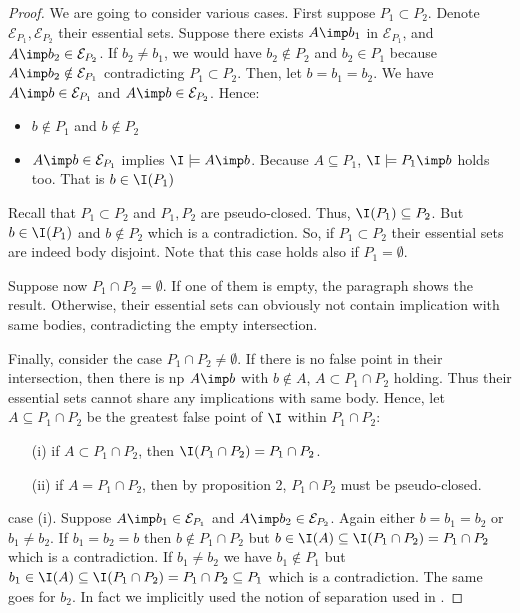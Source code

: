 \begin{proof} We are going to consider various cases. First suppose $P_1 
\subset P_2$. Denote $\mathcal{E}_{P_1}, \mathcal{E}_{P_2}$ their essential 
sets. Suppose there exists $A \imp b_1$ in $\mathcal{E}_{P_1}$, and $A \imp b_2 
\in \mathcal{E}_{P_2}$. If $b_2 \neq b_1$, we would have $b_2 \notin P_2$ and 
$b_2 \in P_1$ because $A \imp b_2 \notin \mathcal{E}_{P_1}$ contradicting $P_1 
\subset P_2$. Then, let $b = b_1 = b_2$. We have $A \imp b \in 
\mathcal{E}_{P_1}$ and $A \imp b \in \mathcal{E}_{P_2}$. Hence:
\begin{itemize}
	\item $b \notin P_1$ and $b \notin P_2$
	\item $A \imp b \in \mathcal{E}_{P_1}$ implies $\I \models A \imp b$. 
	Because 
	$A 
	\subseteq P_1$, $\I \models P_1 \imp b$ holds too. That is $b \in \I(P_1)$
\end{itemize}
\noindent Recall that $P_1 \subset P_2$ and $P_1, P_2$ are pseudo-closed. Thus,
$\I(P_1) \subseteq P_2$. But $b \in \I(P_1)$ and $b \notin P_2$ which is a 
contradiction. So, if $P_1 \subset P_2$ their essential sets are indeed body
disjoint. Note that this case holds also if $P_1 = \emptyset$.

\vspace{1.2em}

Suppose now $P_1 \cap P_2 = \emptyset$. If one of them is empty, the paragraph 
shows the result. Otherwise, their essential sets can obviously not contain 
implication with same bodies, contradicting the empty intersection. 

\vspace{1.2em}

Finally, consider the case $P_1 \cap P_2 \neq \emptyset$. If there is no false
point in their intersection, then there is np $A \imp b$ with $b \notin A$,
$A \subset P_1 \cap P_2$ holding. Thus their essential sets cannot share any
implications with same body. Hence, let $A \subseteq P_1 \cap P_2$ be the 
greatest false point of $\I$ within $P_1 \cap P_2$:
\begin{itemize}
	\item[(i)] if $A \subset P_1 \cap P_2$, then $\I(P_1 \cap P_2) = P_1 \cap 
	P_2$.
	\item[(ii)] if $A = P_1 \cap P_2$, then by proposition 2, $P_1 \cap P_2$ 
	must be	pseudo-closed. 
\end{itemize}
\noindent case (i). Suppose $A \imp b_1 \in \mathcal{E}_{P_1}$ and $A \imp b_2
\in \mathcal{E}_{P_2}$. Again either $b = b_1 = b_2$ or $b_1 \neq b_2$. If $b_1 
= b_2 = b$ then $b \notin P_1 \cap P_2$ but $b \in \I(A) \subseteq \I(P_1 \cap 
P_2) = P_1 \cap P_2$ which is a contradiction. If $b_1 \neq b_2$ we have $b_1 
\notin P_1$ but $b_1 \in \I(A) \subseteq \I(P_1 \cap P_2) = P_1 \cap P_2 
\subseteq P_1$ which is a contradiction. The same goes for $b_2$. In fact we 
implicitly used the notion of separation used in \cite{berczi_directed_2017}.


\end{proof}
